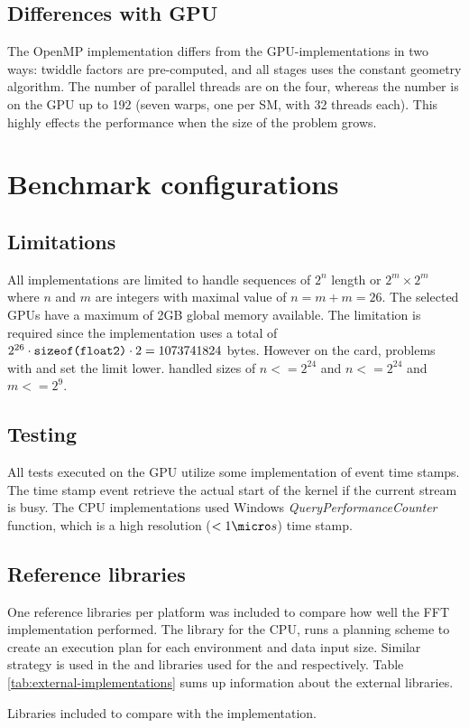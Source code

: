 \subsection{Differences with GPU}

The OpenMP implementation differs from the \gls{GPU}-implementations in two ways: twiddle factors are pre-computed, and all stages uses the constant geometry algorithm. The number of parallel threads are on the {\INTELCPU} four, whereas the number is on the \gls{GPU} up to 192 (seven warps, one per \gls{SM}, with 32 threads each). This highly effects the performance when the size of the problem grows.

\section{Benchmark configurations}

\subsection{Limitations}

All implementations are limited to handle sequences of $2^n$ length or $2^m \times 2^m$ where $n$ and $m$ are integers with maximal value of $n = m + m = 26$. The selected \gls{GPU}s have a maximum of 2GB global memory available. The limitation is required since the implementation uses a total of $2^{26} \cdot \texttt{sizeof(float2)} \cdot 2 = 1073741824$ bytes. However on the {\AMDCARD} card, problems with {\DX} and {\GL} set the limit lower. {\DX} handled sizes of $n <= 2^{24}$ and {\GL} $n <= 2^{24}$ and $m <= 2^{9}$.

\subsection{Testing}

All tests executed on the \gls{GPU} utilize some implementation of event time stamps. The time stamp event retrieve the actual start of the kernel if the current stream is busy. The \gls{CPU} implementations used Windows \emph{QueryPerformanceCounter} function, which is a high resolution ($<1{\micro}s$) time stamp.

\subsection{Reference libraries}

One reference libraries per platform was included to compare how well the FFT implementation performed. The \emph{\FFTW} library for the \gls{CPU}, runs a planning scheme to create an execution plan for each environment and data input size. Similar strategy is used in the {\CUFFT} and {\CLFFT} libraries used for the {\NVCARD} and {\AMDCARD} respectively. Table \ref{tab:external-implementations} sums up information about the external libraries.

\begin{table}
	\centering
	
	\caption{Libraries included to compare with the implementation.}
	\label{tab:external-implementations}
\end{table}